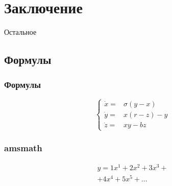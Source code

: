 \section{Заключение}
\begin{frame}
    \begin{center}
        \Huge
        Остальное
    \end{center}
\end{frame}

\subsection{Формулы}

\begin{frame}
    \frametitle{Формулы}
    \[
    \left\{
    \begin{array}{rl}
        \dot x = & \sigma (y-x)  \\
        \dot y = & x (r - z) - y \\
        \dot z = & xy - bz
    \end{array}
    \right.
    \]
\end{frame}

\begin{frame}
    \frametitle{amsmath}
    \centering
    \begin{minipage}[t]{0.5\linewidth}
        \begin{multline*}
            y = 1 x^1 + 2 x^2 + 3 x^3 + \\ + 4 x^4 + 5 x^5 + \dots
        \end{multline*}
    \end{minipage}
\end{frame}

